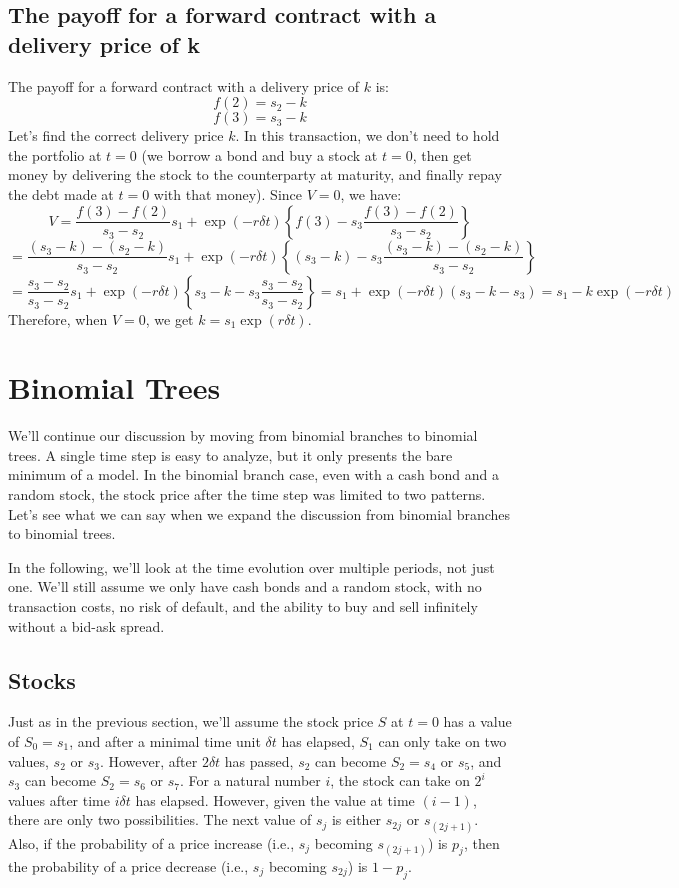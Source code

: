 \documentclass[uplatex,a4j,12pt,dvipdfmx]{jsarticle}
\begin{document}
\subsection{The payoff for a forward contract with a delivery price of k}
The payoff for a forward contract with a delivery price of $k$ is:
\[f(2) = s_2 - k\]
\[f(3) = s_3 - k\]
Let's find the correct delivery price $k$. In this transaction, we don't need to hold the portfolio at $t=0$ (we borrow a bond and buy a stock at $t=0$, then get money by delivering the stock to the counterparty at maturity, and finally repay the debt made at $t=0$ with that money). Since $V=0$, we have:
\[V = \frac{f(3) - f(2)}{s_3 - s_2} s_1 + \exp(-r\delta t) \left\{ f(3) - s_3 \frac{f(3) - f(2)}{s_3 - s_2} \right\} \]
\[= \frac{(s_3-k) - (s_2-k)}{s_3 - s_2} s_1 + \exp(-r\delta t) \left\{ (s_3-k) - s_3 \frac{(s_3-k) - (s_2-k)}{s_3 - s_2} \right\}\]
\[= \frac{s_3 - s_2}{s_3 - s_2} s_1 + \exp(-r\delta t) \left\{ s_3 - k - s_3 \frac{s_3 - s_2}{s_3 - s_2} \right\} = s_1 + \exp(-r\delta t) (s_3 - k - s_3) = s_1 - k \exp(-r\delta t)\]
Therefore, when $V=0$, we get $k = s_1 \exp(r\delta t)$.

\section{Binomial Trees}

We'll continue our discussion by moving from binomial branches to binomial trees. A single time step is easy to analyze, but it only presents the bare minimum of a model. In the binomial branch case, even with a cash bond and a random stock, the stock price after the time step was limited to two patterns. Let's see what we can say when we expand the discussion from binomial branches to binomial trees.

In the following, we'll look at the time evolution over multiple periods, not just one. We'll still assume we only have cash bonds and a random stock, with no transaction costs, no risk of default, and the ability to buy and sell infinitely without a bid-ask spread.

\subsection{Stocks}
Just as in the previous section, we'll assume the stock price $S$ at $t=0$ has a value of $S_0 = s_1$, and after a minimal time unit $\delta t$ has elapsed, $S_1$ can only take on two values, $s_2$ or $s_3$. However, after $2\delta t$ has passed, $s_2$ can become $S_2=s_4$ or $s_5$, and $s_3$ can become $S_2=s_6$ or $s_7$. For a natural number $i$, the stock can take on $2^i$ values after time $i\delta t$ has elapsed. However, given the value at time $(i-1)$, there are only two possibilities. The next value of $s_j$ is either $s_{2j}$ or $s_{(2j+1)}$. Also, if the probability of a price increase (i.e., $s_j$ becoming $s_{(2j+1)}$) is $p_j$, then the probability of a price decrease (i.e., $s_j$ becoming $s_{2j}$) is $1-p_j$.
\end{document}
